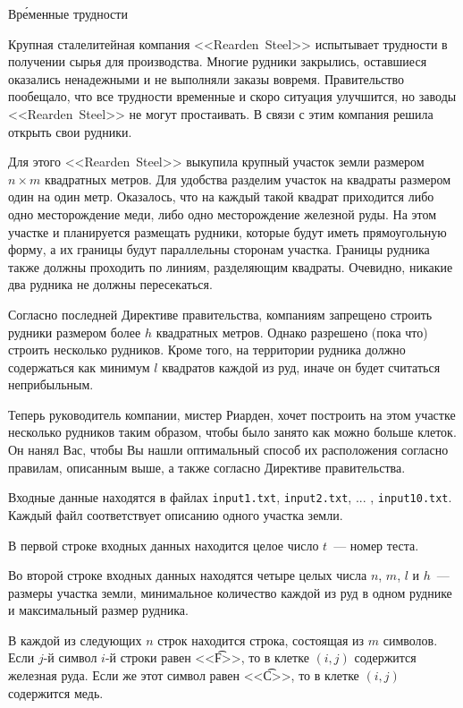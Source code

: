 \begin{problem}{Вр\'{е}менные трудности}{}{}{}{}

Крупная сталелитейная компания <<Rearden~Steel>> испытывает трудности в получении сырья для производства. Многие рудники закрылись, оставшиеся оказались ненадежными и не выполняли заказы вовремя. Правительство пообещало, что все трудности временные и скоро ситуация улучшится, но заводы <<Rearden~Steel>> не могут простаивать. В связи с этим компания решила открыть свои рудники.

Для этого <<Rearden~Steel>> выкупила крупный участок земли размером $n\times m$ квадратных метров. Для удобства разделим участок на квадраты размером один на один метр. Оказалось, что на каждый такой квадрат приходится либо одно месторождение меди, либо одно месторождение железной руды. На этом участке и планируется размещать рудники, которые будут иметь прямоугольную форму, а их границы будут параллельны сторонам участка. Границы рудника также должны проходить по линиям, разделяющим квадраты. Очевидно, никакие два рудника не должны пересекаться.

Согласно последней Директиве правительства, компаниям запрещено строить рудники размером более $h$ квадратных метров. Однако разрешено (пока что) строить несколько рудников. Кроме того, на территории рудника должно содержаться как минимум $l$ квадратов каждой из руд, иначе он будет считаться неприбыльным.

Теперь руководитель компании, мистер Риарден, хочет построить на этом участке несколько рудников таким образом, чтобы было занято как можно больше клеток. Он нанял Вас, чтобы Вы нашли оптимальный способ их расположения согласно правилам, описанным выше, а также согласно Директиве правительства.

\InputFile

Входные данные находятся в файлах \texttt{input1.txt}, \texttt{input2.txt}, ... , \texttt{input10.txt}. Каждый файл соответствует описанию одного участка земли.

В первой строке входных данных находится целое число $t$~--- номер теста.

Во второй строке входных данных находятся четыре целых числа $n$, $m$, $l$ и $h$~--- размеры участка земли, минимальное количество каждой из руд в одном руднике и максимальный размер рудника.

В каждой из следующих $n$ строк находится строка, состоящая из $m$ символов. Если $j$-й символ $i$-й строки равен <<\t{F}>>, то в клетке $(i, j)$ содержится железная руда. Если же этот символ равен <<\t{C}>>, то в клетке $(i, j)$ содержится медь.


\end{problem}
